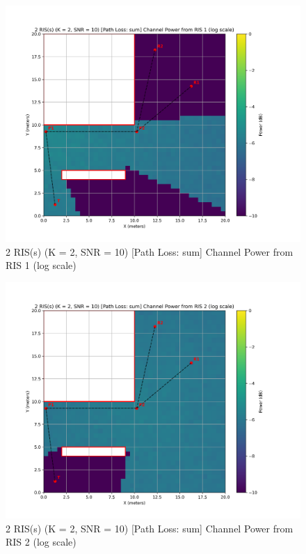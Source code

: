 \begin{figure}[H]
  \centering
  \includegraphics[width=0.8\linewidth]{imgs/heatmap-simulations/2 RIS(s) (K = 2, SNR = 10) [Path Loss_ sum] Channel Power from RIS 1 (log scale).png}
  \caption{2 RIS(s) (K = 2, SNR = 10) [Path Loss: sum] Channel Power from RIS 1 (log scale)}
\end{figure}

\begin{figure}[H]
  \centering
  \includegraphics[width=0.8\linewidth]{imgs/heatmap-simulations/2 RIS(s) (K = 2, SNR = 10) [Path Loss_ sum] Channel Power from RIS 2 (log scale).png}
  \caption{2 RIS(s) (K = 2, SNR = 10) [Path Loss: sum] Channel Power from RIS 2 (log scale)}
\end{figure}

